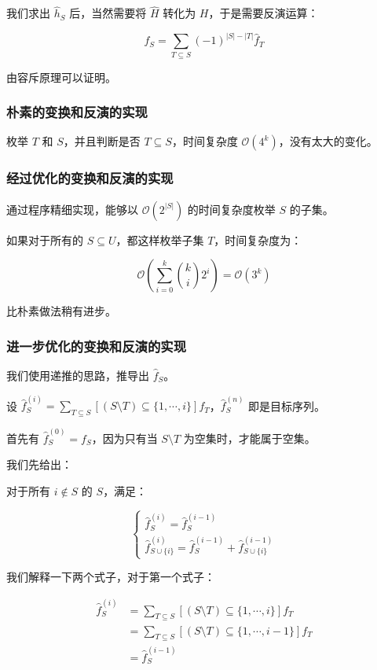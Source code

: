 \documentclass[12pt]{article} %
\begin{document}
我们求出 $\hat h_S$ 后，当然需要将 $\hat H$ 转化为 $H$，于是需要反演运算：

$$f_S=\sum_{T \subseteq S} (-1)^{|S|-|T|}\hat f_T$$

由容斥原理可以证明。

\subsubsection*{朴素的变换和反演的实现}

枚举 $T$ 和 $S$，并且判断是否 $T \subseteq S$，时间复杂度 $\mathcal O(4^k)$，没有太大的变化。

\subsubsection*{经过优化的变换和反演的实现}

通过程序精细实现，能够以 $\mathcal O(2^{|S|})$ 的时间复杂度枚举 $S$ 的子集。

如果对于所有的 $S \subseteq U$，都这样枚举子集 $T$，时间复杂度为：

$$\mathcal O\left(\sum_{i=0}^k \binom{k}{i}2^i\right)= \mathcal O(3^k)$$

比朴素做法稍有进步。

\subsubsection*{进一步优化的变换和反演的实现}

我们使用递推的思路，推导出 $\hat f_S$。

设 $\hat f_S^{(i)}=\sum_{T\subseteq S}[(S\setminus T)\subseteq\{1,\cdots,i\}]f_T$，$\hat f_S^{(n)}$ 即是目标序列。

首先有 $\hat f_S^{(0)}=f_S$，因为只有当 $S \setminus T$ 为空集时，才能属于空集。

我们先给出：

对于所有 $i\notin S$ 的 $S$，满足：

$$
\begin{cases}
	\hat f_S^{(i)}=\hat f_S^{(i-1)} \\
	\hat f_{S\cup\{i\}}^{(i)}=\hat f_S^{(i-1)}+\hat f_{S\cup\{i\}}^{(i-1)}
\end{cases}
$$

我们解释一下两个式子，对于第一个式子：

$$
\begin{aligned}
\hat f_S^{(i)} &= \sum_{T \subseteq S}[(S \setminus T)\subseteq\{1,\cdots,i\}]f_T\\
               &= \sum_{T \subseteq S}[(S \setminus T)\subseteq\{1,\cdots,i-1\}]f_T\\
               &= \hat f_S^{(i-1)}
\end{aligned}
$$
\end{document}
